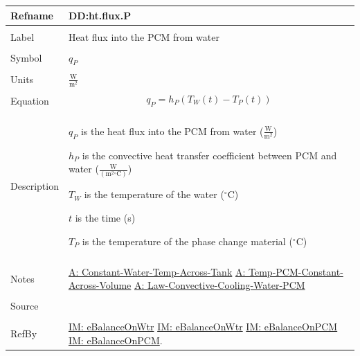\documentclass[12pt]{article}
\begin{document}
\noindent \begin{minipage}{\textwidth}
\begin{tabular}{p{} p{}}
\toprule \textbf{Refname} & \textbf{DD:ht.flux.P}
\label{DD:ht.flux.P}
\\ \midrule \\
Label & Heat flux into the PCM from water
\\ \midrule \\
Symbol & ${q_{P}}$
\\ \midrule \\
Units & $\frac{\text{W}}{\text{m}^{2}}$
\\ \midrule \\
Equation & \begin{displaymath}
           {q_{P}}={h_{P}} \left({T_{W}}\left(t\right)-{T_{P}}\left(t\right)\right)
           \end{displaymath}
\\ \midrule \\
Description & \begin{symbDescription}
              \item{${q_{P}}$ is the heat flux into the PCM from water ($\frac{\text{W}}{\text{m}^{2}}$)}
              \item{${h_{P}}$ is the convective heat transfer coefficient between PCM and water ($\frac{\text{W}}{(\text{m}^{2}{}^{\circ}\text{C})}$)}
              \item{${T_{W}}$ is the temperature of the water (${}^{\circ}$C)}
              \item{$t$ is the time (s)}
              \item{${T_{P}}$ is the temperature of the phase change material (${}^{\circ}$C)}
              \end{symbDescription}
\\ \midrule \\
Notes & \hyperref[assumpCWTAT]{A: Constant-Water-Temp-Across-Tank}
        \hyperref[assumpTPCAV]{A: Temp-PCM-Constant-Across-Volume}
        \hyperref[assumpLCCWP]{A: Law-Convective-Cooling-Water-PCM}
\\ \midrule \\
Source & \cite{koothoor2013}
\\ \midrule \\
RefBy & \hyperref[IM:eBalanceOnWtr]{IM: eBalanceOnWtr} \hyperref[IM:eBalanceOnWtr]{IM: eBalanceOnWtr} \hyperref[IM:eBalanceOnPCM]{IM: eBalanceOnPCM} \hyperref[IM:eBalanceOnPCM]{IM: eBalanceOnPCM}.
\\ \bottomrule \end{tabular}
\end{minipage}
\par~
\end{document}
